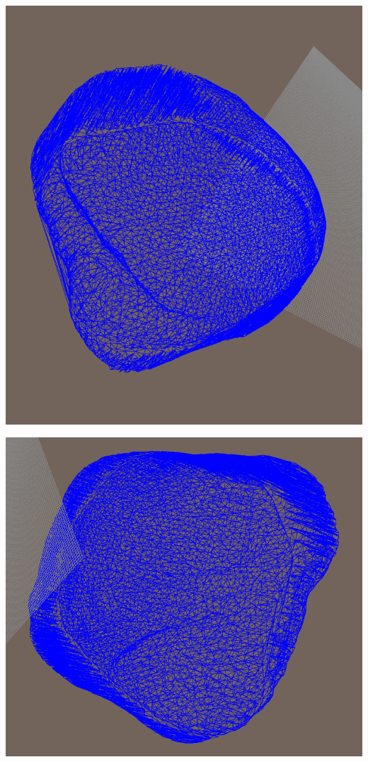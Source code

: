 \documentclass[a4paper, 12pt]{article}   	%
\begin{document}
    \begin{center}
        \begin{minipage}{0.57\linewidth}
            \includegraphics[width=\linewidth]{img/up+down_1}
        \end{minipage}
    \end{center}
    
    \begin{center}
        \begin{minipage}{0.57\linewidth}
            \includegraphics[width=\linewidth]{img/up+down_3}
        \end{minipage}
    \end{center}
    
\end{document}
